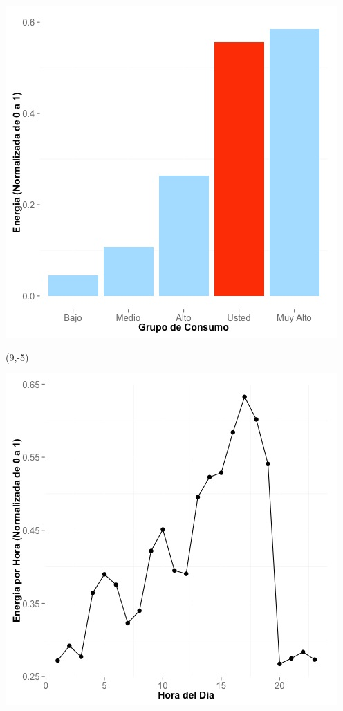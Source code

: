 \documentclass{article}\usepackage[]{graphicx}\usepackage[]{color}
\newenvironment{knitrout}{}{} %
\begin{document}
\begin{knitrout}
\color{fgcolor}
\includegraphics[scale=0.65]{figure/A13_neighbor_plot} 
\end{knitrout}

 \begin{textblock}{1}(9,-5)
\begin{minipage}{20em}
\begingroup

\endgroup
\end{minipage}
\end{textblock}


\begin{knitrout}
\color{fgcolor}
\includegraphics[scale=0.65]{figure/A13_plot_norm_median} 
\end{knitrout}
\end{document}
